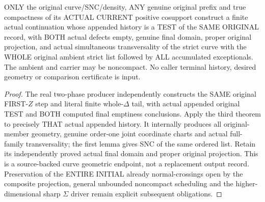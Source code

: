 \begin{theorem}
\label{hir:sharp-original-curve-actual-two-phase-whole-boundary-transverse-producer}
\leanok
ONLY the original curve/SNC/density, ANY genuine original prefix and
true compactness of its ACTUAL CURRENT positive cosupport construct a
finite actual continuation whose appended history is a TEST of the SAME
ORIGINAL record, with BOTH actual defects empty, genuine final domain,
proper original projection, and actual simultaneous transversality of
the strict curve with the WHOLE original ambient strict list followed
by ALL accumulated exceptionals. The ambient and carrier may be
noncompact. No caller terminal history, desired geometry or comparison
certificate is input.
\end{theorem}
\begin{proof}
The real two-phase producer independently constructs the SAME original
FIRST-$Z$ step and literal finite whole-$\Delta$ tail, with actual
appended original TEST and BOTH computed final emptiness conclusions.
Apply the third theorem to precisely THAT actual appended history.
It internally produces all original-member geometry, genuine order-one
joint coordinate charts and actual full-family transversality; the first
lemma gives SNC of the same ordered list. Retain its independently
proved actual final domain and proper original projection. This is a
source-backed curve geometric endpoint, not a replacement output record.
Preservation of the ENTIRE INITIAL already normal-crossings open by the
composite projection, general unbounded noncompact scheduling and the
higher-dimensional sharp $\Sigma$ driver remain explicit subsequent
obligations.
\end{proof}
